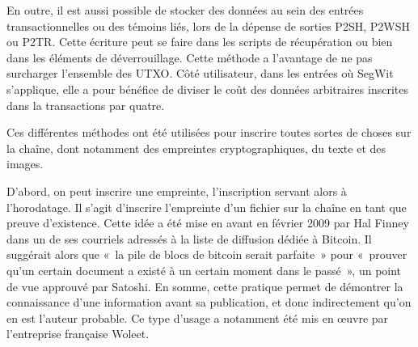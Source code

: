 En outre, il est aussi possible de stocker des données au sein des entrées transactionnelles ou des témoins liés, lors de la dépense de sorties P2SH, P2WSH ou P2TR. Cette écriture peut se faire dans les scripts de récupération ou bien dans les éléments de déverrouillage. Cette méthode a l'avantage de ne pas surcharger l'ensemble des UTXO. Côté utilisateur, dans les entrées où SegWit s'applique, elle a pour bénéfice de diviser le coût des données arbitraires inscrites dans la transactions par quatre.


Ces différentes méthodes ont été utilisées pour inscrire toutes sortes de choses sur la chaîne, dont notamment des empreintes cryptographiques, du texte et des images.

D'abord, on peut inscrire une empreinte, l'inscription servant alors à l'horodatage. Il s'agit d'inscrire l'empreinte d'un fichier sur la chaîne en tant que preuve d'existence. Cette idée a été mise en avant en février 2009 par Hal Finney dans un de ses courriels adressés à la liste de diffusion dédiée à Bitcoin. Il suggérait alors que «~la pile de blocs de bitcoin serait parfaite~» pour «~prouver qu'un certain document a existé à un certain moment dans le passé~», un point de vue approuvé par Satoshi. En somme, cette pratique permet de démontrer la connaissance d'une information avant sa publication, et donc indirectement qu'on en est l'auteur probable. Ce type d'usage a notamment été mis en œuvre par l'entreprise française Woleet. %

